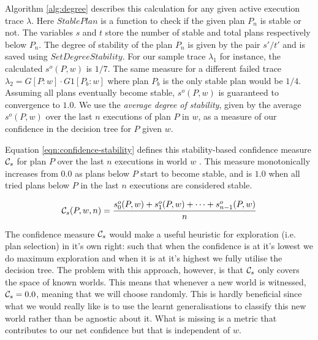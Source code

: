 Algorithm \ref{alg:degree} describes this calculation for any given active execution trace $\lambda$. Here $StablePlan$ is a function to check if the given plan $P_n$ is stable or not. The variables $s$ and $t$ store the number of stable and total plans respectively below $P_n$. The degree of stability of the plan $P_n$ is given by the pair $s'/t'$ and is saved using $SetDegreeStability$. For our sample trace $\lambda_1$ for instance, the calculated $s^o(P,w)$ is $1/7$. The same measure for a different failed trace $\lambda_2=G[P:w] \cdot G1[P_b:w]$ where plan $P_b$ is the only stable plan would be $1/4$. Assuming all plans eventually become stable, $s^o(P,w)$ is guaranteed to convergence to $1.0$. We use the {\em average degree of stability}, given by the average $s^o(P,w)$ over the last $n$ executions of plan $P$ in $w$, as a measure of our confidence in the decision tree for $P$ given $w$.

\begin{algorithm}[ht]
\caption{$UpdateDegreeStability(\lambda, s, t, k, \epsilon)$}
\label{alg:degree}
\end{algorithm}


Equation \ref{eqn:confidence-stability} defines this stability-based confidence measure ${\mathcal{C}}_s$ for plan $P$ over the last $n$ executions in world $w$ . This measure monotonically increases from $0.0$ as plans below $P$ start to become stable, and is $1.0$ when all tried plans below $P$ in the last $n$ executions are considered stable. 

\begin{equation}
{\ensuremath{\mathcal{C}}}_s(P,w,n) = \frac{s^o_0(P,w) + s^o_1(P,w) + \cdots + s^o_{n-1}(P,w)}{n}
\label{eqn:confidence-stability}
\end{equation}


The confidence measure ${\mathcal{C}}_s$ would make a useful heuristic for exploration (i.e. plan selection) in it's own right: such that when the confidence is at it's lowest we do maximum exploration and when it is at it's highest we fully utilise the decision tree. The problem with this approach, however, is that ${\mathcal{C}}_s$ only covers the space of known worlds. This means that whenever a new world is witnessed, ${\mathcal{C}}_s=0.0$, meaning that we will choose randomly. This is hardly beneficial since what we would really like is to use the learnt generalisations to classify this new world rather than be agnostic about it. What is missing is a metric that contributes to our net confidence but that is independent of $w$.

